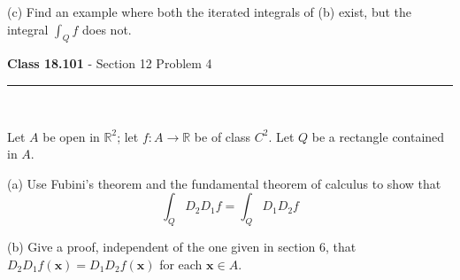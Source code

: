 \documentclass[11pt,reqno]{article}
\begin{document}
\noindent (c) Find an example where both the iterated integrals of (b) exist, but the integral $\int_Q f$ does not.

\begin{flushleft} 
\textbf{Class 18.101} - Section 12 Problem 4\\
\rule{500pt}{1pt}\\
\end{flushleft} 

\noindent Let $A$ be open in $\mathbb{R}^2$; let $f : A \to \mathbb{R}$ be of class $C^2$. Let $Q$ be a rectangle contained in $A$.

\noindent (a) Use Fubini's theorem and the fundamental theorem of calculus to show that
\[ \int_Q D_2 D_1 f = \int_Q D_1 D_2 f \]

\noindent (b) Give a proof, independent of the one given in section 6, that $D_2 D_1 f(\textbf{x}) = D_1 D_2 f(\textbf{x})$ for each $\textbf{x} \in A$.
\end{document}
